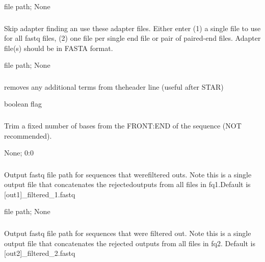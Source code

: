 \documentclass[letterpaper,10pt,english]{sphinxmanual}
\begin{document}
 file path;  None


\subsubsection{}
\label{\detokenize{prog_desc:a-adapters}}
 Skip adapter finding an use these adapter files. Either enter (1) a single  file to use for all fastq files, (2)  one file per single end file or pair  of paired-end files. Adapter file(s) should be in FASTA format.

 file path;  None


\subsubsection{}
\label{\detokenize{prog_desc:clean-header}}
 removes any additional terms from theheader line (useful after STAR)

 boolean flag


\subsubsection{}
\label{\detokenize{prog_desc:f-trim-fixed}}
 Trim a fixed number of bases from the FRONT:END of the sequence (NOT recommended).

 None;  0:0


\subsubsection{}
\label{\detokenize{prog_desc:filt1}}
 Output fastq file path for sequences that werefiltered outs. Note this is a single output file that concatenates the rejectedoutputs from all files in \textendash{}fq1.Default is {[}\textendash{}out1{]}\_filtered\_1.fastq

 file path;  None


\subsubsection{}
\label{\detokenize{prog_desc:filt2}}
 Output fastq file path for sequences that were filtered out. Note this is a single output file that concatenates the rejected outputs from all files in \textendash{}fq2. Default is {[}\textendash{}out2{]}\_filtered\_2.fastq
\end{document}
